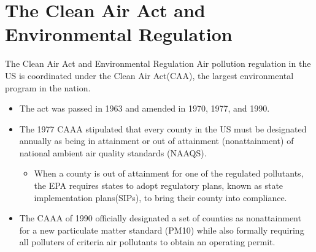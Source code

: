 \documentclass{beamer}
\begin{document}
\section{The Clean Air Act and Environmental Regulation}
\begin{frame}[shrink]
	\transfade %
	\tableofcontents[sectionstyle=show/shaded,subsectionstyle=show/shaded/hide]
	\addtocounter{framenumber}{-1}
\end{frame}
\begin{frame}{The Clean Air Act and Environmental Regulation}
	Air pollution regulation in the US is coordinated under the Clean Air Act(CAA), the largest environmental program in the nation.
	\begin{itemize}
		\item The act was passed in 1963 and amended in 1970, 1977, and 1990.
		\item The 1977 CAAA stipulated that every county in the US must be designated annually as being in attainment or out of attainment (nonattainment) of national ambient air quality standards (NAAQS).
		\begin{itemize}
			\item When a county is out of attainment for one of the regulated pollutants, the EPA requires states to adopt regulatory plans, known as state implementation plans(SIPs), to bring their county into compliance.
		\end{itemize}
		\item The CAAA of 1990 officially designated a set of counties as nonattainment for a new particulate matter standard (PM10) while also formally requiring all polluters of criteria air pollutants to obtain an operating permit.
	\end{itemize}
\end{frame}
\end{document}
